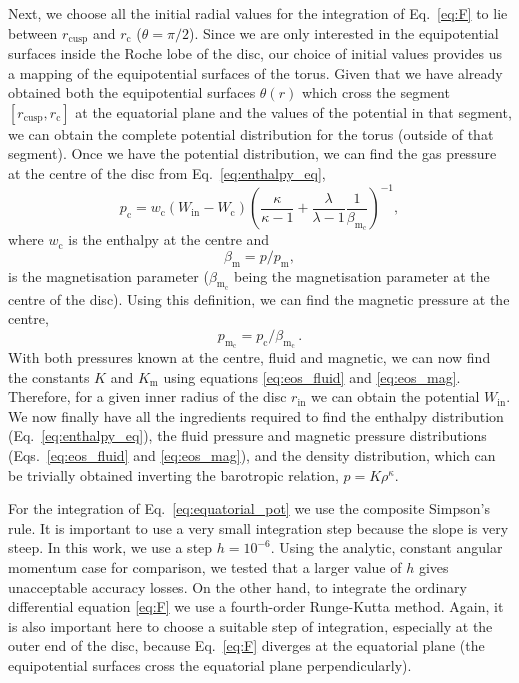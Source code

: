 \documentclass[referee]{aa}
\begin{document}
Next, we choose all the initial radial values for the integration of Eq.~\eqref{eq:F} to lie between $r_{\mathrm{cusp}}$ and $r_{\mathrm{c}}$ ($\theta = \pi / 2$). Since we are only interested in the equipotential surfaces inside the Roche lobe of the disc, our choice of initial values provides us a mapping of the equipotential surfaces of the torus. Given that we have already obtained both the equipotential surfaces $\theta(r)$ which cross the segment $[r_{\mathrm{cusp}}, r_{\mathrm{c}}]$ at the equatorial plane and the values of the potential in that segment, we can obtain the complete potential distribution for the torus (outside of that segment). Once we have the potential distribution, we can find the gas pressure at the centre of the disc from Eq.~\eqref{eq:enthalpy_eq},
\begin{equation}
p_{\mathrm{c}} = w_{\mathrm{c}}(W_{\mathrm{in}} - W_{\mathrm{c}})\left(\frac{\kappa}{\kappa - 1} + \frac{\lambda
}{\lambda
 - 1}\frac{1}{\beta_{\mathrm{m}_{\mathrm{c}}}}\right)^{-1},
\end{equation}
where $w_{\mathrm{c}}$ is the enthalpy at the centre and
\begin{equation}
\label{eq:beta_eq}
\beta_{\mathrm{m}} = p/p_{\mathrm{m}},
\end{equation}
is the magnetisation parameter ($\beta_{\mathrm{m}_{\mathrm{c}}}$ being the magnetisation parameter at the centre of the disc). Using this definition, we can find the magnetic pressure at the centre,
\begin{equation}
p_{\mathrm{m_{\mathrm{c}}}} = p_{\mathrm{c}}/\beta_{\mathrm{m}_{\mathrm{c}}}\,.
\end{equation}
With both pressures known at the centre, fluid and magnetic, we can now find the constants $K$ and $K_{\mathrm{m}}$ using equations \eqref{eq:eos_fluid} and \eqref{eq:eos_mag}. Therefore, for a given inner radius of the disc $r_{\mathrm{in}}$ we can obtain the potential $W_{\mathrm{in}}$. We now finally have all the ingredients required to find the enthalpy distribution (Eq.~\eqref{eq:enthalpy_eq}), the fluid pressure and magnetic pressure distributions (Eqs.~\eqref{eq:eos_fluid} and \eqref{eq:eos_mag}), and the density distribution, which can be trivially obtained inverting the barotropic relation, $p = K \rho^{\kappa}$. 

For the integration of Eq.~\eqref{eq:equatorial_pot} we use the composite Simpson's rule. It is important to use a very small integration step because the slope is very steep. In this work, we use a step $h = 10^{-6}$. Using the analytic, constant angular momentum case for comparison, we tested that 
a larger value of $h$ gives unacceptable accuracy losses. On the other hand, to integrate the ordinary differential equation \eqref{eq:F} we use a fourth-order Runge-Kutta method. Again, it is also important here to choose a suitable step of integration, especially at the outer end of the disc, because Eq.~\eqref{eq:F} diverges at the equatorial plane (the equipotential surfaces cross the equatorial plane perpendicularly).
\end{document}
